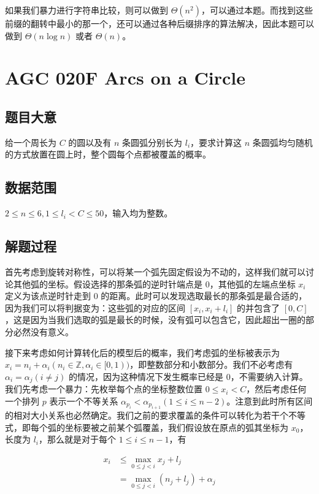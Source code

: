 \documentclass[12pt]{ctexart}
\begin{document}
如果我们暴力进行字符串比较，则可以做到 $\Theta(n^2)$，可以通过本题。而找到这些前缀的翻转中最小的那一个，还可以通过各种后缀排序的算法解决，因此本题可以做到 $\Theta(n\log n)$ 或者 $\Theta(n)$。

\newpage

\section{AGC 020F Arcs on a Circle}

\subsection{题目大意}

给一个周长为 $C$ 的圆以及有 $n$ 条圆弧分别长为 $l_i$，要求计算这 $n$ 条圆弧均匀随机的方式放置在圆上时，整个圆每个点都被覆盖的概率。

\subsection{数据范围}

$2\le n\le 6, 1\le l_i < C\le 50$，输入均为整数。

\subsection{解题过程}

首先考虑到旋转对称性，可以将某一个弧先固定假设为不动的，这样我们就可以讨论其他弧的坐标。假设选择的那条弧的逆时针端点是 $0$，其他弧的左端点坐标 $x_i$ 定义为该点逆时针走到 $0$ 的距离。此时可以发现选取最长的那条弧是最合适的，因为我们可以将判据变为：这些弧的对应的区间 $[x_i, x_i + l_i]$ 的并包含了 $[0, C]$，这是因为当我们选取的弧是最长的时候，没有弧可以包含它，因此超出一圈的部分必然没有意义。

接下来考虑如何计算转化后的模型后的概率，我们考虑弧的坐标被表示为 $x_i = n_i + \alpha_i (n_i \in \mathbb Z, \alpha_i \in [0, 1) )$，即整数部分和小数部分。我们不必考虑有 $\alpha_i = \alpha_j(i\neq j)$ 的情况，因为这种情况下发生概率已经是 0，不需要纳入计算。我们先考虑一个暴力：先枚举每个点的坐标整数位置 $0\le x_i < C$，然后考虑任何一个排列 $p$ 表示一个不等关系 $\alpha_{p_i} < \alpha_{p_{i + 1}} (1\le i\le n - 2)$。注意到此时所有区间的相对大小关系也必然确定。我们之前的要求覆盖的条件可以转化为若干个不等式，即每个弧的坐标要被之前某个弧覆盖，我们假设放在原点的弧其坐标为 $x_0$，长度为 $l_i$，那么就是对于每个 $1\le i\le n - 1$，有

\begin{align*}
x_i & \le \max_{0\le j < i} x_j + l_j\\
&= \max_{0\le j < i} (n_j + l_j) + \alpha_j
\end{align*}
\end{document}
